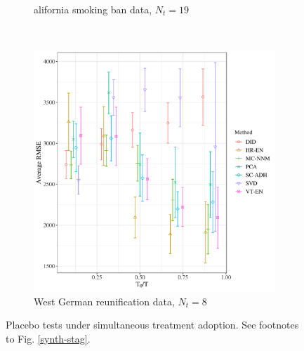 \documentclass[12pt]{article}
\begin{document}
\begin{figure}[htbp]
\begin{subfigure}[t]{0.45\textwidth}
		\caption{alifornia smoking ban data, $N_t = 19$}
	\end{subfigure}
	~
	\begin{subfigure}[t]{0.45\textwidth}
		\centering
		\includegraphics[width=\textwidth]{plots/germany_N_16_T_44_numruns_20_num_treated_8_simultaneuous_1.png}
		\caption{West German reunification data, $N_t = 8$} 
	\end{subfigure}
	\caption{Placebo tests under simultaneous treatment adoption. See footnotes to Fig. \ref{synth-stag}. \label{synth-sim}} 
\end{figure}
\end{document}
